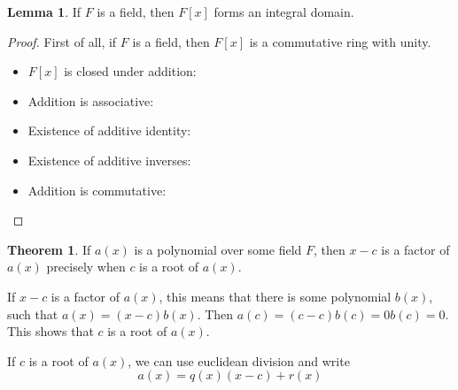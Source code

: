 \documentclass{article}
\theoremstyle{definition}
\newtheorem{theorem}{Theorem}
\theoremstyle{definition}
\newtheorem{lemma}{Lemma}
\begin{document}
\begin{lemma} 
  If $F$ is a field, then $F[x]$ forms an integral domain.
\end{lemma} 
\begin{proof}
  First of all, if $F$ is a field, then $F[x]$ is a commutative ring with unity.
  \begin{itemize}
    \item $F[x]$ is closed under addition:
    \item Addition is associative:
    \item Existence of additive identity:
    \item Existence of additive inverses:
    \item Addition is commutative:
  \end{itemize}
\end{proof}

\begin{theorem} 
  If $a(x)$ is a polynomial over some field $F$, then $x - c$ is a factor of $a(x)$ precisely when $c$ is a root of $a(x)$.
\end{theorem}
If $x - c$ is a factor of $a(x)$, this means that there is some polynomial $b(x)$, such that $a(x) = (x - c)b(x)$. Then $a(c) = (c - c)b(c) = 0 b(c) = 0$. This shows that $c$ is a root of $a(x)$.

If $c$ is a root of $a(x)$, we can use euclidean division and write 
$$ a(x) = q(x)(x - c) + r(x) $$


% 
% 
% 
% 
% 
\end{document}

